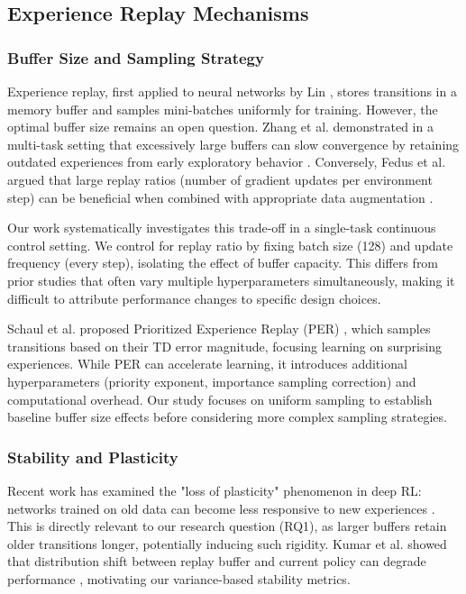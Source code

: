 \subsection{Experience Replay Mechanisms}

\subsubsection{Buffer Size and Sampling Strategy}

Experience replay, first applied to neural networks by Lin \cite{lin1992self}, stores transitions in a memory buffer and samples mini-batches uniformly for training. However, the optimal buffer size remains an open question. Zhang et al. demonstrated in a multi-task setting that excessively large buffers can slow convergence by retaining outdated experiences from early exploratory behavior \cite{zhang2018study}. Conversely, Fedus et al. argued that large replay ratios (number of gradient updates per environment step) can be beneficial when combined with appropriate data augmentation \cite{fedus2020revisiting}.

Our work systematically investigates this trade-off in a single-task continuous control setting. We control for replay ratio by fixing batch size (128) and update frequency (every step), isolating the effect of buffer capacity. This differs from prior studies that often vary multiple hyperparameters simultaneously, making it difficult to attribute performance changes to specific design choices.

Schaul et al. proposed Prioritized Experience Replay (PER) \cite{schaul2015prioritized}, which samples transitions based on their TD error magnitude, focusing learning on surprising experiences. While PER can accelerate learning, it introduces additional hyperparameters (priority exponent, importance sampling correction) and computational overhead. Our study focuses on uniform sampling to establish baseline buffer size effects before considering more complex sampling strategies.

\subsubsection{Stability and Plasticity}

Recent work has examined the "loss of plasticity" phenomenon in deep RL: networks trained on old data can become less responsive to new experiences \cite{lyle2023understanding}. This is directly relevant to our research question (RQ1), as larger buffers retain older transitions longer, potentially inducing such rigidity. Kumar et al. showed that distribution shift between replay buffer and current policy can degrade performance \cite{kumar2020conservative}, motivating our variance-based stability metrics.

